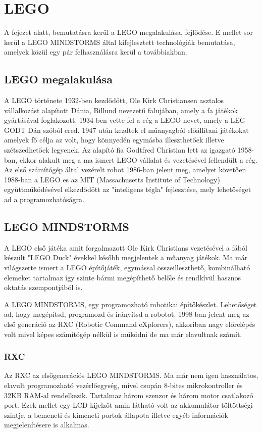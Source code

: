 \chapter{LEGO} \label{ch:ROBOT}

\begin{osszefoglal}
	A fejezet alatt, bemutatásra kerül a LEGO megalakulása, fejlődése. E mellet sor kerül a LEGO MINDSTORMS által kifejlesztett technológiák bemutatása, amelyek közül egy pár felhasználásra kerül a továbbiakban.
\end{osszefoglal}

\section{LEGO megalakulása}\label{sec:ROBOT:lego}
A LEGO története 1932-ben kezdődött,  Ole Kirk Christiansen asztalos vállalkozást alapított Dánia, Billund nevezetű falujában, amely a fa játékok gyártásával foglakozott. 1934-ben vette fel a cég a LEGO nevet, amely a LEG GODT Dán szóból ered. 1947 után kezdtek el műanyagból előállítani játékokat amelyek fő célja az volt, hogy könnyedén egymásba illeszthetőek illetve szétszedhetőek legyenek. Az alapító fia Godtfred Christian lett az igazgató 1958-ban, ekkor alakult meg a ma ismert LEGO vállalat és vezetésével fellendült a cég. Az első számítógép által vezérelt robot 1986-ban jelent meg, amelyet követően 1988-ban a LEGO es az MIT (Massachusetts Institute of Technology) együttműködésével elkezdődött az "inteligens tégla" fejlesztése, mely lehetőséget ad a programozhatóságra.

\section{LEGO MINDSTORMS}\label{sec:ROBOT:mindstorms}
A LEGO első játéka amit forgalmazott Ole Kirk Christians vezetésével a fából készült "LEGO Duck" évekkel később megjelentek a műanyag játékok. Ma már világszerte ismert a LEGO építőjáték, egymással összeilleszthető, kombinálható elemeket tartalmaz így szinte bármi megépíthető belőle és rendkívül hasznos oktatás szempontjából is. 

A LEGO MINDSTORMS, egy programozható robotikai építőkészlet. Lehetőséget ad, hogy megépítsd, programozd és irányítsd a robotot.
1998-ban jelent meg az első generáció az RXC  (Robotic Command eXplorers), akkoriban nagy előrelépés volt mivel képes számítógép nélkül is működni de ma már elavultnak számít.

\subsection{RXC}
Az RXC az elsőgenerácíós LEGO MINDSTORMS. Ma már nem igen használatos, elavult programozható vezérlőegység, mivel csupán 8-bites mikrokontroller és 32KB RAM-al rendelkezik. Tartalmaz három szenzor és három motor csatlakozó port. Ezek mellet egy LCD kijelzőt amin látható volt az akkumulátor töltöttségi szintje, a bemeneti és kimeneti portok állapota illetve egyéb információk megjelenítésere is alkalmas.

